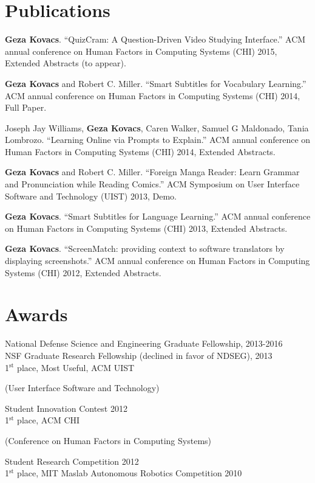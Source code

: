 \documentclass[margin,line]{resume}
\begin{document}
\begin{resume}
\section{\mysidestyle Publications}

\textbf{Geza Kovacs}. ``QuizCram: A Question-Driven Video Studying Interface.'' ACM annual conference on Human Factors in Computing Systems (CHI) 2015, Extended Abstracts (to appear).

\textbf{Geza Kovacs} and Robert C. Miller. ``Smart Subtitles for Vocabulary Learning.'' ACM annual conference on Human Factors in Computing Systems (CHI) 2014, Full Paper.

Joseph Jay Williams, \textbf{Geza Kovacs}, Caren Walker, Samuel G Maldonado, Tania Lombrozo. ``Learning Online via Prompts to Explain.'' ACM annual conference on Human Factors in Computing Systems (CHI) 2014, Extended Abstracts.

\textbf{Geza Kovacs} and Robert C. Miller. ``Foreign Manga Reader: Learn Grammar and Pronunciation while Reading Comics.'' ACM Symposium on User Interface Software and Technology (UIST) 2013, Demo.

\textbf{Geza Kovacs}. ``Smart Subtitles for Language Learning.'' ACM annual conference on Human Factors in Computing Systems (CHI) 2013, Extended Abstracts.%

\textbf{Geza Kovacs}. ``ScreenMatch: providing context to software translators by displaying screenshots.'' ACM annual conference on Human Factors in Computing Systems (CHI) 2012, Extended Abstracts.%

\section{\mysidestyle Awards}

National Defense Science and Engineering Graduate Fellowship, 2013-2016\\
NSF Graduate Research Fellowship (declined in favor of NDSEG), 2013 \\
1$^{\textrm{st}}$ place, Most Useful, ACM UIST \begin{small}(User Interface Software and Technology)\end{small} Student Innovation Contest 2012\\
1$^{\textrm{st}}$ place, ACM CHI \begin{small}(Conference on Human Factors in Computing Systems)\end{small} Student Research Competition 2012\\
1$^{\textrm{st}}$ place, MIT Maslab Autonomous Robotics Competition 2010


\end{resume}
\end{document}
